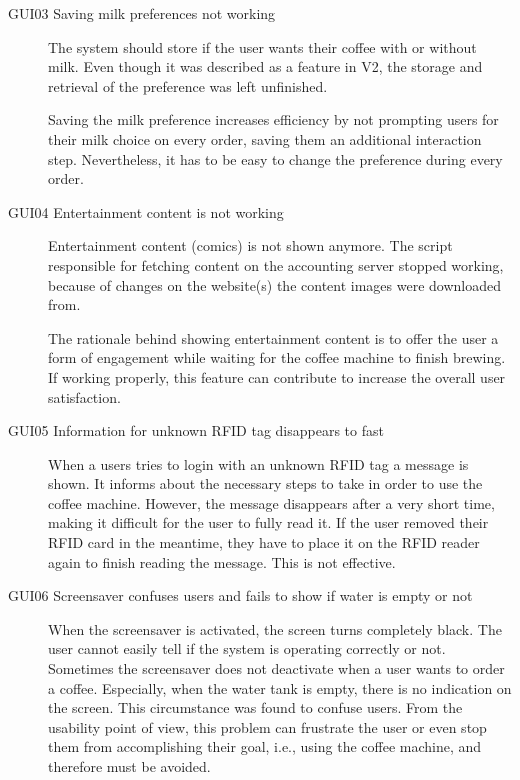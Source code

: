 \documentclass[12pt]{article}
\begin{document}
\begin{description}
\item [GUI03 Saving milk preferences not working]
\label{pa:GUI03}
The system should store if the user wants their coffee with or without milk.
Even though it was described as a feature in V2, the storage and retrieval of the preference was left unfinished.

Saving the milk preference increases efficiency by not prompting users for their milk choice on every order, saving them an additional interaction step.
Nevertheless, it has to be easy to change the preference during every order.


\item [GUI04 Entertainment content is not working]
\label{pa:GUI04}
Entertainment content (comics) is not shown anymore.
The script responsible for fetching content on the accounting server stopped working,
because of changes on the website(s) the content images were downloaded from.

The rationale behind showing entertainment content is to offer the user a form of engagement while waiting for the coffee machine to finish brewing.
If working properly, this feature can contribute to increase the overall user satisfaction.

\item [GUI05 Information for unknown RFID tag disappears to fast]\hspace*{\fill}
\label{pa:GUI05}
When a users tries to login with an unknown RFID tag a message is shown.
It informs about the necessary steps to take in order to use the coffee machine.
However, the message disappears after a very short time, making it difficult for the user to fully read it.
If the user removed their RFID card in the meantime, they have to place it on the RFID reader again to finish reading the message.
This is not effective.

\item [GUI06 Screensaver confuses users and fails to show if water is empty or not]
\label{pa:GUI06}
When the screensaver is activated, the screen turns completely black. 
The user cannot easily tell if the system is operating correctly or not.
Sometimes the screensaver does not deactivate when a user wants to order a coffee.
Especially, when the water tank is empty, there is no indication on the screen. This circumstance was found to confuse users.
From the usability point of view, this problem can frustrate the user or even stop them from accomplishing their goal,
i.e., using the coffee machine, and therefore must be avoided.


\end{description}
\end{document}
